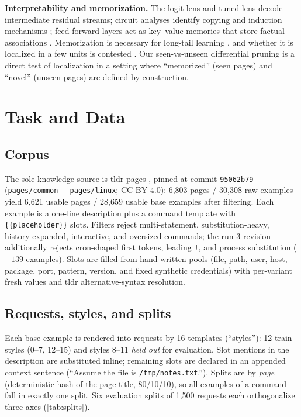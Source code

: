\documentclass[11pt,a4paper]{article}
\begin{document}
\textbf{Interpretability and memorization.} The logit lens
\citep{nostalgebraist2020logitlens} and tuned lens \citep{belrose2023tunedlens}
decode intermediate residual streams; circuit analyses
\citep{elhage2021framework,wang2023ioi} identify copying and induction
mechanisms \citep{olsson2022induction}; feed-forward layers act as key--value
memories \citep{geva2021kv} that store factual associations
\citep{dai2022knowledge,meng2022rome}. Memorization is necessary for long-tail
learning \citep{feldman2020memorization}, and whether it is localized in a few
units is contested \citep{chang2024localization,stoehr2024paragraph}. Our
seen-vs-unseen differential pruning is a direct test of localization in a
setting where ``memorized'' (seen pages) and ``novel'' (unseen pages) are
defined by construction.

\section{Task and Data}
\label{sec:data}

\subsection{Corpus}
The sole knowledge source is tldr-pages \citep{tldrpages}, pinned at commit
\texttt{95062b79} (\texttt{pages/common} + \texttt{pages/linux};
CC-BY-4.0): 6,803 pages / 30,308 raw examples yield 6,621 usable pages /
28,659 usable base examples after filtering. Each example is a one-line
description plus a command template with \texttt{\{\{placeholder\}\}} slots.
Filters reject multi-statement, substitution-heavy, history-expanded,
interactive, and oversized commands; the run-3 revision additionally rejects
cron-shaped first tokens, leading \texttt{!}, and process substitution
($-139$ examples). Slots are filled from hand-written pools (file, path, user,
host, package, port, pattern, version, and fixed synthetic credentials) with
per-variant fresh values and tldr alternative-syntax resolution.

\subsection{Requests, styles, and splits}
Each base example is rendered into requests by 16 templates (``styles''): 12
train styles (0--7, 12--15) and styles 8--11 \emph{held out} for evaluation.
Slot mentions in the description are substituted inline; remaining slots are
declared in an appended context sentence (``Assume the file is
\texttt{/tmp/notes.txt}.''). Splits are by \emph{page} (deterministic hash of
the page title, 80/10/10), so all examples of a command fall in exactly one
split. Six evaluation splits of 1{,}500 requests each orthogonalize three
axes (\cref{tab:splits}).
\end{document}
